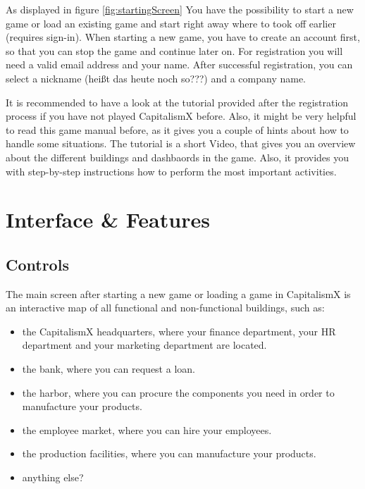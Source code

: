 \documentclass[11pt,titlepage,oneside,openany]{book}
\begin{document}
As displayed in figure \ref{fig:startingScreen} You have the possibility to start a new game or load an existing game and start right away where to took off earlier (requires sign-in). When starting a new game, you have to create an account first, so that you can stop the game and continue later on. For registration you will need a valid email address and your name. After successful registration, you can select a nickname (heißt das heute noch so???) and a company name. 

It is recommended to have a look at the tutorial provided after the registration process if you have not played CapitalismX before. Also, it might be very helpful to read this game manual before, as it gives you a couple of hints about how to handle some situations. The tutorial is a short Video, that gives you an overview about the different buildings and dashbaords in the game. Also, it provides you with step-by-step instructions how to perform the most important activities.

\section{Interface \& Features}

\subsection{Controls}  
The main screen after starting a new game or loading a game in CapitalismX is an interactive map of all functional and non-functional buildings, such as:
\begin{itemize}
    \item the CapitalismX headquarters, where your finance department, your HR department and your marketing department are located. 
    \item the bank, where you can request a loan.
    \item the harbor, where you can procure the components you need in order to manufacture your products.
    \item the employee market, where you can hire your employees.
    \item the production facilities, where you can manufacture your products.
    \item anything else?
\end{itemize}
\end{document}
